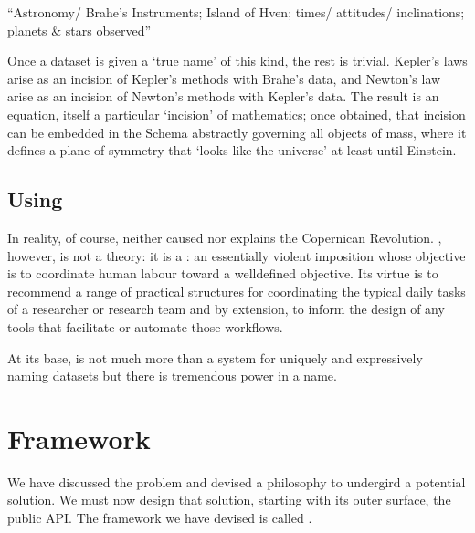 \documentclass[letterpaper,10pt,english]{jupyterBook}
\begin{document}
\sphinxAtStartPar
“Astronomy/ Brahe’s Instruments; Island of Hven; times/ attitudes/ inclinations; planets \& stars observed”

\sphinxAtStartPar
Once a dataset is given a ‘true name’ of this kind, the rest is trivial. Kepler’s laws arise as an incision of Kepler’s methods with Brahe’s data, and Newton’s law arise as an incision of Newton’s methods with Kepler’s data. The result is an equation, itself a particular ‘incision’ of mathematics; once obtained, that incision can be embedded in the Schema abstractly governing all objects of mass, where it defines a plane of symmetry that ‘looks like the universe’ \sphinxhyphen{} at least until Einstein.


\subsection{Using }
\label{\detokenize{content/chapter_03_everest/doctrine:using-akp}}
\sphinxAtStartPar
In reality, of course,  neither caused nor explains the Copernican Revolution. , however, is not a theory: it is a : an essentially violent imposition whose objective is to coordinate human labour toward a well\sphinxhyphen{}defined objective. Its virtue is to recommend a range of practical structures for coordinating the typical daily tasks of a researcher or research team \sphinxhyphen{} and by extension, to inform the design of any tools that facilitate or automate those workflows.

\sphinxAtStartPar
At its base,  is not much more than a system for uniquely and expressively naming datasets \sphinxhyphen{} but there is tremendous power in a name.


\section{Framework}
\label{\detokenize{content/chapter_03_everest/framework:framework}}\label{\detokenize{content/chapter_03_everest/framework::doc}}
\sphinxAtStartPar
We have discussed the problem and devised a philosophy to undergird a potential solution. We must now design that solution, starting with its outer surface, the public API. The framework we have devised is called .
\end{document}
